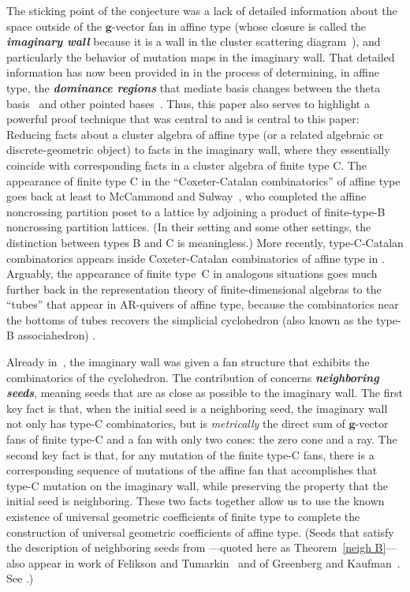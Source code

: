 \documentclass{amsart}
\theoremstyle{definition}
\theoremstyle{remark}
\numberwithin{equation}{section}
\newcommand{\newword}[1]{\textbf{\emph{#1}}}
\newcommand{\0}{{\mathbf{0}}}
\newcommand{\g}{\mathbf{g}}
\begin{document}
The sticking point of the conjecture was a lack of detailed information about the space outside of the $\g$-vector fan in affine type (whose closure is called the \newword{imaginary wall} because it is a wall in the cluster scattering diagram~\cite{affscat}), and particularly the behavior of mutation maps in the imaginary wall.
That detailed information has now been provided in \cite{affdomreg} in the process of determining, in affine type, the \newword{dominance regions} \cite{RSDom} that mediate basis changes between the theta basis~\cite{GHKK} and other pointed bases~\cite{FanQin}.
Thus, this paper also serves to highlight a powerful proof technique that was central to \cite{affdomreg} and is central to this paper:  
Reducing facts about a cluster algebra of affine type (or a related algebraic or discrete-geometric object) to facts in the imaginary wall, where they essentially coincide with corresponding facts in a cluster algebra of finite type C.
The appearance of finite type C in the ``Coxeter-Catalan combinatorics'' of affine type goes back at least to McCammond and Sulway~\cite{McSul}, who completed the affine noncrossing partition poset to a lattice by adjoining a product of finite-type-B noncrossing partition lattices.
(In their setting and some other settings, the distinction between types B and C is meaningless.)
More recently, type-C-Catalan combinatorics appears inside Coxeter-Catalan combinatorics of affine type in \cite{affncA,affncD,affdomreg,affdenom,afftheta}.
Arguably, the appearance of finite type~C in analogous situations goes much further back in the representation theory of finite-dimensional algebras to the ``tubes'' that appear in AR-quivers of affine type, because the combinatorics near the bottoms of tubes recovers the simplicial cyclohedron (also known as the type-B associahedron) \cite{BottTaubes,Simion}.

Already in~\cite{affdenom}, the imaginary wall was given a fan structure that exhibits the combinatorics of the cyclohedron. 
The contribution of \cite{affdomreg} concerns \newword{neighboring seeds}, meaning seeds that are as close as possible to the imaginary wall.
The first key fact is that, when the initial seed is a neighboring seed, the imaginary wall not only has type-C combinatorics, but is \emph{metrically} the direct sum of $\g$-vector fans of finite type-C and a fan with only two cones: the zero cone and a ray.
The second key fact is that, for any mutation of the finite type-C fans, there is a corresponding sequence of mutations of the affine fan that accomplishes that type\nobreakdash-C mutation on the imaginary wall, while preserving the property that the initial seed is neighboring.
These two facts together allow us to use the known existence of universal geometric coefficients of finite type to complete the construction of universal geometric coefficients of affine type.
(Seeds that satisfy the description of neighboring seeds from \cite[Theorem~4.38]{affdomreg}---quoted here as Theorem~\ref{neigh B}---also appear in work of Felikson and Tumarkin~\cite{FeTuCoeff} and of Greenberg and Kaufman~\cite{GreenbergKaufman}.
See \cite[Remark~4.39]{affdomreg}.)
\end{document}
